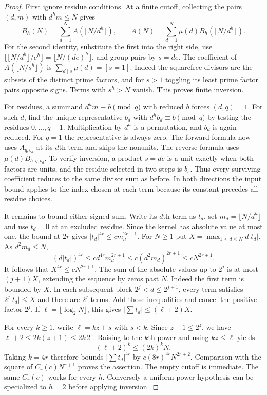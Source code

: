 \begin{proof}
First ignore residue conditions. At a finite cutoff, collecting the pairs $(d,m)$ with $d^h m\le N$ gives
\[
 B_h(N)=\sum_{d=1}^N A(\lfloor N/d^h\rfloor),\qquad
 A(N)=\sum_{d=1}^N \mu(d)B_h(\lfloor N/d^h\rfloor).
\]
For the second identity, substitute the first into the right side, use
$\lfloor\lfloor N/d^h\rfloor/e^h\rfloor=\lfloor N/(de)^h\rfloor$, and group pairs by $s=de$.
The coefficient of $A(\lfloor N/s^h\rfloor)$ is
$\sum_{d\mid s}\mu(d)=[s=1]$. Indeed the squarefree divisors are the subsets of the distinct prime factors, and for $s>1$ toggling its least prime factor pairs opposite signs. Terms with $s^h>N$ vanish. This proves finite inversion.

For residues, a summand $d^h m\equiv b\pmod q$ with reduced $b$ forces $(d,q)=1$.
For such $d$, find the unique representative $b_d$ with
$d^h b_d\equiv b\pmod q$ by testing the residues $0,\ldots,q-1$. Multiplication by $d^h$ is a permutation, and $b_d$ is again reduced. For $q=1$ the representative is always zero.
The forward formula now uses $A_{q,b_d}$ at its $d$th term and skips the nonunits. The reverse formula uses $\mu(d)B_{h,q,b_d}$. To verify inversion, a product $s=de$ is a unit exactly when both factors are units, and the residue selected in two steps is $b_s$. Thus every surviving coefficient reduces to the same divisor sum as before. In both directions the input bound applies to the index chosen at each term because its constant precedes all residue choices.

It remains to bound either signed sum. Write its $d$th term as $t_d$, set
$m_d=\lfloor N/d^h\rfloor$ and use $t_d=0$ at an excluded residue.
Since the kernel has absolute value at most one, the bound at $2r$ gives
$|t_d|^{4r}\le c m_d^{2r+1}$. For $N\ge1$ put $X=\max_{1\le d\le N} d|t_d|$.
As $d^2m_d\le N$,
\[
   (d|t_d|)^{4r}
   \le c d^{4r}m_d^{2r+1}
   \le c(d^2m_d)^{2r+1}
   \le c N^{2r+1}.
\]
It follows that $X^{4r}\le cN^{2r+1}$. The sum of the absolute values up to $2^j$ is at most $(j+1)X$, extending the sequence by zeros past $N$. Indeed the first term is bounded by $X$. In each subsequent block $2^j<d\le2^{j+1}$, every term satisfies $2^j|t_d|\le X$ and there are $2^j$ terms. Add those inequalities and cancel the positive factor $2^j$. If $\ell=\lfloor\log_2 N\rfloor$, this gives $|\sum t_d|\le (\ell+2)X$.

For every $k\ge1$, write $\ell=kz+s$ with $s<k$. Since $z+1\le2^z$, we have $\ell+2\le2k(z+1)\le2k\,2^z$. Raising to the $k$th power and using $kz\le\ell$ yields
\[
                       (\ell+2)^k\le (2k)^k N.
\]
Taking $k=4r$ therefore bounds $|\sum t_d|^{4r}$ by $c(8r)^{4r}N^{2r+2}$. Comparison with the square of $C_r(c)N^{r+1}$ proves the assertion. The empty cutoff is immediate. The same $C_r(c)$ works for every $h$. Conversely a uniform-power hypothesis can be specialized to $h=2$ before applying inversion.


\end{proof}
